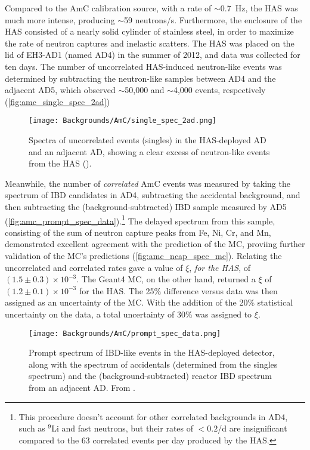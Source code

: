 \documentclass[../thesis.tex]{subfiles}
\begin{document}
Compared to the AmC calibration source, with a rate of $\sim$0.7~Hz, the HAS was much more intense, producing $\sim$59 neutrons/s. Furthermore, the enclosure of the HAS consisted of a nearly solid cylinder of stainless steel, in order to maximize the rate of neutron captures and inelastic scatters. The HAS was placed on the lid of EH3-AD1 (named AD4) in the summer of 2012, and data was collected for ten days. The number of uncorrelated HAS-induced neutron-like events was determined by subtracting the neutron-like samples between AD4 and the adjacent AD5, which observed $\sim$50,000 and $\sim$4,000 events, respectively (\autoref{fig:amc_single_spec_2ad})

\begin{figure}[ht]
  \texttt{[image: Backgrounds/AmC/single\_spec\_2ad.png]}
  \caption{Spectra of uncorrelated events (singles) in the HAS-deployed AD and an adjacent AD, showing a clear excess of neutron-like events from the HAS (\cite{Gu_2016}).}
  \label{fig:amc_single_spec_2ad}
\end{figure}

Meanwhile, the number of \emph{correlated} AmC events was measured by taking the spectrum of IBD candidates in AD4, subtracting the accidental background, and then subtracting the (background-subtracted) IBD sample measured by AD5 (\autoref{fig:amc_prompt_spec_data}).\footnote{This procedure doesn't account for other correlated backgrounds in AD4, such as $^9$Li and fast neutrons, but their rates of $< 0.2$/d are insignificant compared to the 63 correlated events per day produced by the HAS.} The delayed spectrum from this sample, consisting of the sum of neutron capture peaks from Fe, Ni, Cr, and Mn, demonstrated excellent agreement with the prediction of the MC, proviing further validation of the MC's predictions (\autoref{fig:amc_ncap_spec_mc}). Relating the uncorrelated and correlated rates gave a value of $\xi$, \emph{for the HAS}, of $(1.5\pm0.3)\times10^{-3}$. The Geant4 MC, on the other hand, returned a $\xi$ of $(1.2\pm0.1)\times10^{-3}$ for the HAS. The 25\% difference versus data was then assigned as an uncertainty of the MC. With the addition of the 20\% statistical uncertainty on the data, a total uncertainty of 30\% was assigned to $\xi$.

\begin{figure}[ht]
  \texttt{[image: Backgrounds/AmC/prompt\_spec\_data.png]}
  \caption{Prompt spectrum of IBD-like events in the HAS-deployed detector, along with the spectrum of accidentals (determined from the singles spectrum) and the (background-subtracted) reactor IBD spectrum from an adjacent AD. From \cite{Gu_2016}.}
  \label{fig:amc_prompt_spec_data}
\end{figure}
\end{document}

